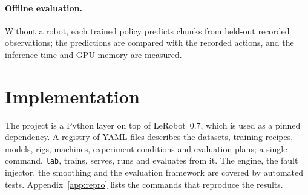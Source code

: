 \paragraph{Offline evaluation.} Without a robot, each trained policy predicts chunks from held-out recorded
observations; the predictions are compared with the recorded actions, and the inference time and GPU memory are
measured.

\section{Implementation}\label{sec:impl}

The project is a Python layer on top of LeRobot~0.7, which is used as a pinned dependency. A registry of YAML files
describes the datasets, training recipes, models, rigs, machines, experiment conditions and evaluation plans; a single
command, \texttt{lab}, trains, serves, runs and evaluates from it. The \drtc{} engine, the fault injector, the smoothing
and the evaluation framework are covered by automated tests. Appendix~\ref{app:repro} lists the commands that reproduce
the results.
